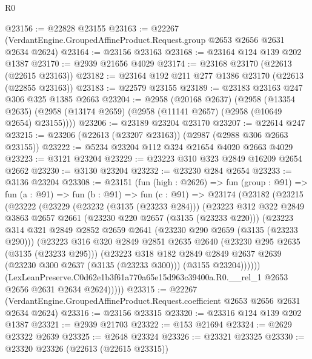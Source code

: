 \begin{lexlean}{R0}
\begin{coremodule}
@23156 := @22828 @23155
@23163 := @22267 (VerdantEngine.GroupedAffineProduct.Request.group @2653 @2656 @2631 @2634 @2624)
@23164 := @23156 @23163
@23168 := @23164 @124 @139 @202 @1387
@23170 := @2939 @21656 @4029
@23174 := @23168 @23170 (@22613 (@22615 @23163))
@23182 := @23164 @192 @211 @277 @1386 @23170 (@22613 (@22855 @23163))
@23183 := @22579 @23155
@23189 := @23183 @23163 @247 @306 @325 @1385 @2663
@23204 := @2958
    (@20168 @2637)
    (@2958
      (@13354 @2635)
      (@2958 (@13174 @2659) (@2958 (@11141 @2657) (@2958 (@10649 @2654) @23155))))
@23206 := @23189 @23204 @23170
@23207 := @22614 @247
@23215 := @23206 (@22613 (@23207 @23163)) (@2987 (@2988 @306 @2663 @23155))
@23222 := @5234 @23204 @112 @324 @21654 @4020 @2663 @4029
@23223 := @3121 @23204
@23229 := @23223 @310 @323 @2849 @16209 @2654 @2662
@23230 := @3130 @23204
@23232 := @23230 @284 @2654
@23233 := @3136 @23204
@23308 := @23151
    (fun (high : @2626) =>
    fun (group : @91) =>
    fun (a : @91) =>
    fun (b : @91) =>
    fun (c : @91) =>
    @23174
      (@23182
        (@23215
          (@23222
            (@23229
              (@23232 (@3135 (@23233 @284)))
              (@23223
                @312
                @322
                @2849
                @3863
                @2657
                @2661
                (@23230 @220 @2657 (@3135 (@23233 @220)))
                (@23223
                  @314
                  @321
                  @2849
                  @2852
                  @2659
                  @2641
                  (@23230 @290 @2659 (@3135 (@23233 @290)))
                  (@23223
                    @316
                    @320
                    @2849
                    @2851
                    @2635
                    @2640
                    (@23230 @295 @2635 (@3135 (@23233 @295)))
                    (@23223
                      @318
                      @182
                      @2849
                      @2849
                      @2637
                      @2639
                      (@23230 @300 @2637 (@3135 (@23233 @300)))
                      (@3155 @23204))))))
            (LexLeanPreserve.C0d62e1b3f61a770a65e15d963c39400a.R0.__rel_1
              @2653
              @2656
              @2631
              @2634
              @2624)))))
@23315 := @22267
    (VerdantEngine.GroupedAffineProduct.Request.coefficient @2653 @2656 @2631 @2634 @2624)
@23316 := @23156 @23315
@23320 := @23316 @124 @139 @202 @1387
@23321 := @2939 @21703
@23322 := @153 @21694
@23324 := @2629 @23322 @2639
@23325 := @2648 @23324
@23326 := @23321 @23325
@23330 := @23320 @23326 (@22613 (@22615 @23315))

\end{coremodule}
\end{lexlean}
